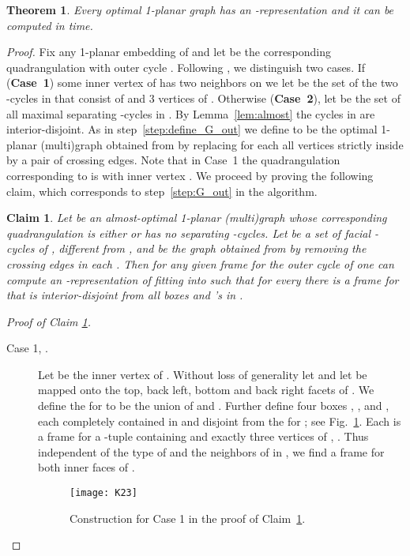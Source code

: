 \documentclass{article}
\newcounter{dummycount}
\newtheorem{theorem}{Theorem}
\newtheorem{claim}{Claim}
\newenvironment{claimproof}[1]{\noindent \textit{Proof of Claim #1.}}
{
\hfill \medskip
}
\newenvironment{backInTime}[1]
{
\setcounter{dummycount}{\value{theorem}}
\setcounter{theorem}{\value{#1}}
}
{
\setcounter{theorem}{\value{dummycount}}
}
\newcommand{\LL}{\xspace}
\begin{document}
\begin{backInTime}{thm-1-planar}
 \begin{theorem}
  Every optimal 1-planar graph  has an \LL-representation and it can be computed in  time.
 \end{theorem}
\end{backInTime}
\begin{proof}
 Fix any 1-planar embedding of  and let  be the corresponding quadrangulation with outer cycle . Following {\drawOpt},
we distinguish two cases.
 If (\textbf{Case~1}) some inner vertex  of  has two neighbors on  we let  be the set of the two -cycles in  that consist of  and 3 vertices of .
 Otherwise (\textbf{Case~2}), let  be the set of all maximal separating -cycles in .
By Lemma~\ref{lem:almost} the cycles in  are interior-disjoint.
 As in step~\ref{step:define_G_out} we define  to be the optimal 1-planar (multi)graph obtained from  by replacing for each  all vertices strictly inside  by a pair of crossing edges.
 Note that in Case~1 the quadrangulation corresponding to  is  with inner vertex .
 We proceed by proving the following claim, which corresponds to step~\ref{step:G_out} in the algorithm.


 \begin{claim}
  Let  be an almost-optimal 1-planar (multi)graph whose corresponding quadrangulation  is either  or has no separating -cycles.
  Let  be a set of facial -cycles of , different from , and  be the graph obtained from  by removing the crossing edges in each .
  Then for any given frame  for the outer cycle  of  one can compute an
 \LL-representation  of  fitting into  such that for every  there is a frame  for  that is interior-disjoint from all boxes and \LL's in .
\label{cl:two-case}
 \end{claim}
 \begin{claimproof}{\ref{cl:two-case}}
  \begin{description}
   \item[Case 1, .] Let  be the inner vertex of .
    Without loss of generality let  and let  be mapped onto the top, back left, bottom and back right facets of .
    We define the \LL for  to be the union of  and .
    Further define four boxes , ,  and , each completely contained in  and disjoint from the \LL for ; see Fig.~\ref{fig:K23}.
Each  is a frame for a -tuple containing  and exactly three vertices of , .
    Thus independent of the type of  and the neighbors of  in , we find a frame for both inner faces of .

    \begin{figure}[htb]
     \centering
     \texttt{[image: K23]}
     \caption{Construction for Case 1 in the proof of Claim~\ref{cl:two-case}.}
     \label{fig:K23}
    \end{figure}


\end{description}
\end{claimproof}
\end{proof}
\end{document}
